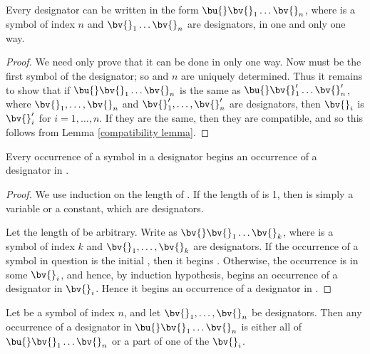 \begin{theorem}
    Every designator can be written in the form $\bu{} \bv{}_1 \dots \bv{}_n$, where \bu{} is a symbol of index $n$ and $\bv{}_1 \dots \bv{}_n$ are designators, in one and only one way.
\end{theorem}

\begin{proof}
    We need only prove that it can be done in only one way.
    Now \bu{} must be the first symbol of the designator;
    so \bu{} and $n$ are uniquely determined.
    Thus it remains to show that if $\bu{} \bv{}_1 \dots \bv{}_n$ is the same as $\bu{} \bv{}_1' \dots \bv{}_n'$, where $\bv{}_1, \dots, \bv{}_n$ and $\bv{}_1', \dots, \bv{}_n'$ are designators, then $\bv{}_i$ is $\bv{}_i'$ for $i = 1, \dots, n$.
    If they are the same, then they are compatible, and so this follows from Lemma \ref{compatibility lemma}.
\end{proof}

\begin{lemma}\label{occurrence lemma}
    Every occurrence of a symbol in a designator \bu{} begins an occurrence of a designator in \bu{}.
\end{lemma}

\begin{proof}
    We use induction on the length of \bu{}.
    If the length of \bu{} is 1, then \bu{} is simply a variable or a constant, which are designators.
    
    Let the length of \bu{} be arbitrary.
    Write \bu{} as $\bv{} \bv{}_1 \dots \bv{}_k$, where \bv{} is a symbol of index $k$ and $\bv{}_1, \dots, \bv{}_k$ are designators.
    If the occurrence of a symbol in question is the initial \bv{}, then it begins \bu{}.
    Otherwise, the occurrence is in some $\bv{}_i$, and hence, by induction hypothesis, begins an occurrence of a designator in $\bv{}_i$.
    Hence it begins an occurrence of a designator in \bu{}.
\end{proof}

\begin{theorem}\label{occurrence theorem}
    Let \bu{} be a symbol of index $n$, and let $\bv{}_1, \dots, \bv{}_n$ be designators.
    Then any occurrence of a designator \bv{} in $\bu{} \bv{}_1 \dots \bv{}_n$ is either all of $\bu{} \bv{}_1 \dots \bv{}_n$ or a part of one of the $\bv{}_i$.
\end{theorem}

